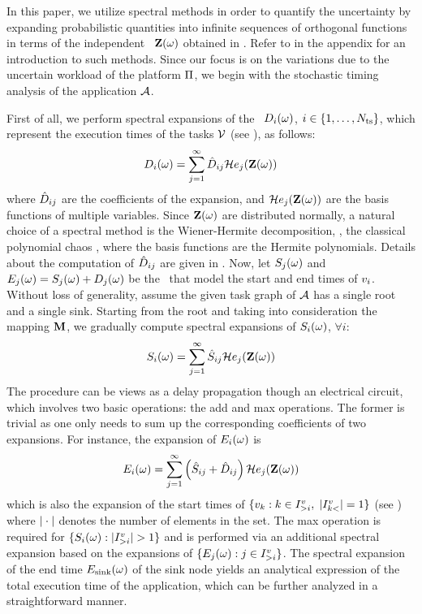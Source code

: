 In this paper, we utilize spectral methods in order to quantify the uncertainty by expanding probabilistic quantities into infinite sequences of orthogonal functions in terms of the independent \rvs\ $\mathbf{Z}(\omega)$ obtained in . Refer to  in the appendix for an introduction to such methods. Since our focus is on the variations due to the uncertain workload of the platform $\Pi$, we begin with the stochastic timing analysis of the application $\mathcal{A}$.

First of all, we perform spectral expansions of the \rvs\ $D_i(\omega)$, $i \in \{ 1, \dots, {N_\text{ts}} \}$, which represent the execution times of the tasks $\mathcal{V}$ (see ), as follows:
\[
  D_i(\omega) = \sum_{j = 1}^\infty \hat{D}_{ij} \mathcal{H}e_j(\mathbf{Z}(\omega))
\]
where $\hat{D}_{ij}$ are the coefficients of the expansion, and $\mathcal{H}e_j(\mathbf{Z}(\omega))$ are the basis functions of multiple variables. Since $\mathbf{Z}(\omega)$ are distributed normally, a natural choice of a spectral method is the Wiener-Hermite decomposition, \ie, the classical polynomial chaos \cite{ghanem2003}, where the basis functions are the Hermite polynomials. Details about the computation of $\hat{D}_{ij}$ are given in . Now, let $S_j(\omega)$ and $E_j(\omega) = S_j(\omega) + D_j(\omega)$ be the \rvs\ that model the start and end times of $v_i$. Without loss of generality, assume the given task graph of $\mathcal{A}$ has a single root and a single sink. Starting from the root and taking into consideration the mapping $\mathbf{M}$, we gradually compute spectral expansions of $S_i(\omega)$, $\forall i$:
\[
  S_i(\omega) = \sum_{j = 1}^\infty \hat{S}_{ij} \mathcal{H}e_j(\mathbf{Z}(\omega))
\]
The procedure can be views as a delay propagation though an electrical circuit, which involves two basic operations: the add and max operations. The former is trivial as one only needs to sum up the corresponding coefficients of two expansions. For instance, the expansion of $E_i(\omega)$ is
\[
  E_i(\omega) = \sum_{j = 1}^\infty \left( \hat{S}_{ij} + \hat{D}_{ij} \right) \mathcal{H}e_j(\mathbf{Z}(\omega))
\]
which is also the expansion of the start times of $\{ v_k: k \in I^v_{>i}, \; |I^v_{k<}| = 1 \}$ (see ) where $|\cdot|$ denotes the number of elements in the set. The max operation is required for $\{ S_i(\omega): |I^v_{>i}| > 1 \}$ and is performed via an additional spectral expansion based on the expansions of $\{ E_j(\omega): j \in I^v_{>i} \}$. The spectral expansion of the end time $E_\text{sink}(\omega)$ of the sink node yields an analytical expression of the total execution time of the application, which can be further analyzed in a straightforward manner.
